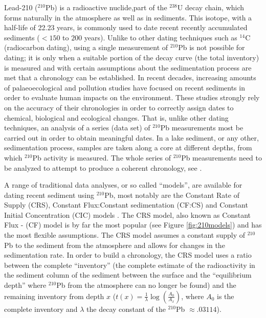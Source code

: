 \documentclass [10pt] {article}
\begin{document}
Lead-210 ($^{210}$Pb) is a radioactive nuclide,part of the $^{238}$U decay chain, which forms naturally in the atmosphere as well as in sediments.
This isotope, with a half-life of 22.23 years, is commonly used to date recent recently accumulated sediments ($<150$ to $200$ years). 
Unlike to other dating techniques such as $^{14}$C (radiocarbon dating), using a single measurement of $^{210}$Pb is not possible for dating; it is only when a suitable portion of the decay curve (the total inventory) is measured and with certain assumptions about the sedimentation process are met that a chronology can be established.  
In recent decades, increasing amounts of palaeoecological and pollution studies have focused on recent sediments \citep[e.g.,][]{Courtney2019} in order to evaluate human impacts on the environment.
These studies strongly rely on the accuracy of their chronologies in order to correctly assign dates to chemical, biological and ecological changes.
That is, unlike other dating techniques, an analysis of a series (data set) of $^{210}$Pb measurements most be carried out in order to obtain meaningful dates.  In a lake sediment, or any other, sedimentation process, samples are taken along a core at different depths, from which $^{210}$Pb activity is measured.  
The whole series of $^{210}$Pb measurements need to be analyzed to attempt to produce a coherent chronology, see \cite{Aquino2018}.

A range of traditional data analyses, or so called ``models'', are available for dating recent sediment using $^{210}$Pb, most notably are the Constant Rate of Supply (CRS), Constant Flux:Constant sedimentation (CF:CS) and Constant Initial Concentration (CIC) models \citep{Appleby1978,Robbins1978,Sanchez-Cabeza2012} . 
The CRS model, also known as Constant Flux - (CF) model is by far the most popular (see Figure \ref{fig:210models}) and has the most flexible assumptions. 
The CRS model assumes a constant supply of $^{210}$Pb to the sediment from the atmosphere and allows for changes in the sedimentation rate. 
In order to build a chronology, the CRS model uses a ratio between the complete ``inventory'' (the complete estimate of the radioactivity in the sediment column of the sediment between the surface and the ``equilibrium depth'' where $^{210}$Pb from the atmosphere can no longer be found) and the remaining  inventory from depth $x$ ($t(x)=\frac{1}{\lambda}\log\left( \frac{A_0}{A_x}\right)$, where $A_0$ is the complete inventory and $\lambda$ the decay constant of the $^{210}$Pb $\approx .03114$).
\end{document}
